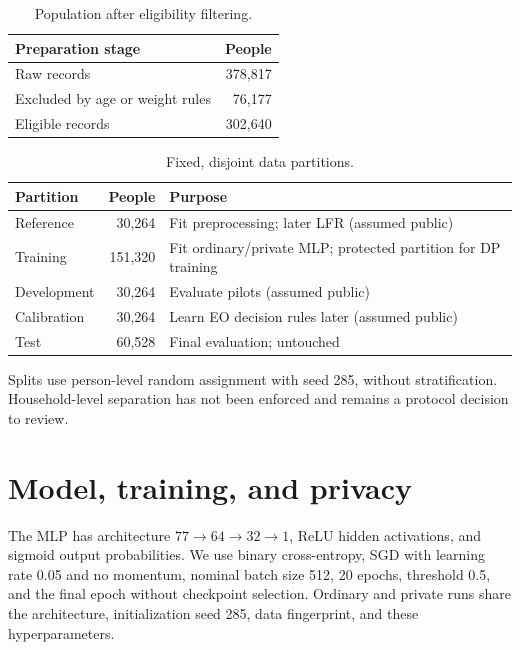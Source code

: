 \documentclass[11pt,letterpaper]{article}
\begin{document}
\begin{table}[H]
\centering\small
\begin{tabular}{lr}\toprule
Preparation stage & People\\\midrule
Raw records & 378,817\\
Excluded by age or weight rules & 76,177\\
Eligible records & 302,640\\\bottomrule
\end{tabular}
\caption{Population after eligibility filtering.}\label{tab:population}
\end{table}

\begin{table}[H]
\centering\small
\begin{tabularx}{\linewidth}{lrX}\toprule
Partition & People & Purpose\\\midrule
Reference & 30,264 & Fit preprocessing; later LFR (assumed public)\\
Training & 151,320 & Fit ordinary/private MLP; protected partition for DP training\\
Development & 30,264 & Evaluate pilots (assumed public)\\
Calibration & 30,264 & Learn EO decision rules later (assumed public)\\
Test & 60,528 & Final evaluation; untouched\\\bottomrule
\end{tabularx}
\caption{Fixed, disjoint data partitions.}\label{tab:splits}
\end{table}
Splits use person-level random assignment with seed 285, without stratification. Household-level separation has not been enforced and remains a protocol decision to review.

\section{Model, training, and privacy}
The MLP has architecture $77\rightarrow64\rightarrow32\rightarrow1$, ReLU hidden activations, and sigmoid output probabilities. We use binary cross-entropy, SGD with learning rate 0.05 and no momentum, nominal batch size 512, 20 epochs, threshold 0.5, and the final epoch without checkpoint selection. Ordinary and private runs share the architecture, initialization seed 285, data fingerprint, and these hyperparameters.
\end{document}
